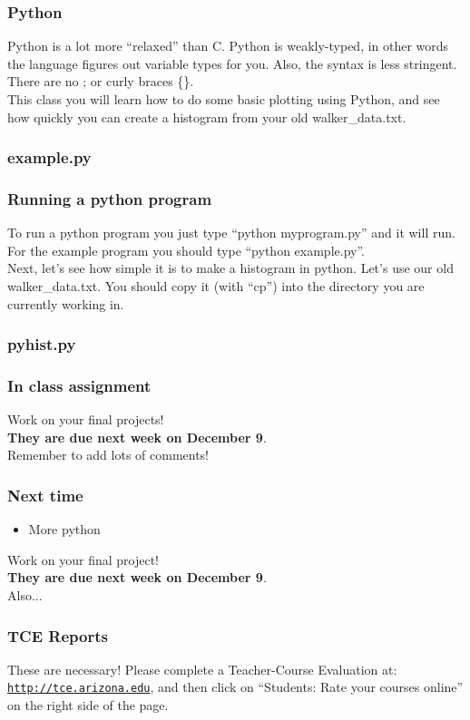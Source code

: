 \documentclass{beamer}
\begin{document}
\begin{frame}
  \frametitle{Python}
  Python is a lot more ``relaxed'' than C. Python is weakly-typed, in other
  words the language figures out variable types for you. Also, the syntax
  is less stringent. There are no ; or curly braces \{\}.\\
  This class you will learn how to do some basic plotting using Python,
  and see how quickly you can create a histogram from your old 
  walker\_data.txt.
\end{frame}


\begin{frame}
  \frametitle{example.py}
  
\end{frame}

\begin{frame}
  \frametitle{Running a python program}
  To run a python program you just type ``python myprogram.py'' and it 
  will run.\\
  \vspace{12pt}
  For the example program you should type ``python example.py''.
  \\
  \vspace{12pt}
  Next, let's see how simple it is to make a histogram in python. Let's
  use our old walker\_data.txt. You should copy it (with ``cp'') into the
  directory you are currently working in.
\end{frame}

\begin{frame}
  \frametitle{pyhist.py}
  
\end{frame}  

\begin{frame}
  \frametitle{In class assignment}
  Work on your final projects!\\ \textbf{They are due next week on December 9}.\\
  Remember to add lots of comments!
\end{frame}

\begin{frame}
  \frametitle{Next time}
  \begin{itemize}
  \item More python
  \end{itemize}
  Work on your final project!\\\textbf{They are due next week on December 9}.\\
  Also...
\end{frame}

\begin{frame}
  \frametitle{TCE Reports}
  These are necessary! Please complete a Teacher-Course Evaluation at:
  \href{http://tce.arizona.edu}{\nolinkurl{http://tce.arizona.edu}},
  and then click on ``Students: Rate your courses online'' on the right side
  of the page.
\end{frame}
\end{document}
